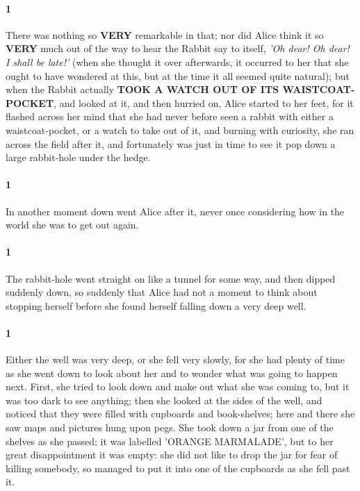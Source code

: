 \documentclass[12pt]{article}
\begin{document}
\paragraph{1} There was nothing so \textbf{VERY} remarkable in that; nor did Alice think it so
\textbf{VERY} much out of the way to hear the Rabbit say to itself, \textit{'Oh dear!
    Oh dear! I shall be late!'} (when she thought it over afterwards, it
occurred to her that she ought to have wondered at this, but at the time
it all seemed quite natural); but when the Rabbit actually \textbf{TOOK A WATCH
OUT OF ITS WAISTCOAT-POCKET}, and looked at it, and then hurried on,
Alice started to her feet, for it flashed across her mind that she had
never before seen a rabbit with either a waistcoat-pocket, or a watch
to take out of it, and burning with curiosity, she ran across the field
after it, and fortunately was just in time to see it pop down a large
rabbit-hole under the hedge.


\paragraph{1} In another moment down went Alice after it, never once considering how
in the world she was to get out again.


\paragraph{1} The rabbit-hole went straight on like a tunnel for some way, and then
dipped suddenly down, so suddenly that Alice had not a moment to think
about stopping herself before she found herself falling down a very deep
well.


\paragraph{1} Either the well was very deep, or she fell very slowly, for she had
plenty of time as she went down to look about her and to wonder what was
going to happen next. First, she tried to look down and make out what
she was coming to, but it was too dark to see anything; then she
looked at the sides of the well, and noticed that they were filled with
cupboards and book-shelves; here and there she saw maps and pictures
hung upon pegs. She took down a jar from one of the shelves as
she passed; it was labelled \textmd{'ORANGE MARMALADE'}, but to her great
disappointment it was empty: she did not like to drop the jar for fear
of killing somebody, so managed to put it into one of the cupboards as
she fell past it.
\end{document}
